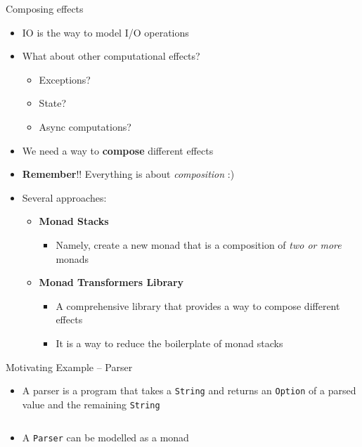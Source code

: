 \documentclass[presentation, 10pt]{beamer}\mode<presentation>{\usetheme{metropolis}}
\begin{document}
\begin{frame}{Composing effects}
\begin{itemize}
	\item IO is the way to model I/O operations
	\item What about other computational effects?
	\begin{itemize}
		\item Exceptions?
		\item State?
		\item Async computations?
	\end{itemize}
	\item We need a way to \textbf{compose} different effects
	\item \textbf{Remember}!! Everything is about \emph{composition} :)
	\item Several approaches:
	\begin{itemize}
		\item \textbf{Monad Stacks}
		\begin{itemize}
			\item Namely, create a new monad that is a composition of \emph{two or more} monads
		\end{itemize}
		\item \textbf{Monad Transformers Library}
		\begin{itemize}
			\item A comprehensive library that provides a way to compose different effects
			\item It is a way to reduce the boilerplate of monad stacks
		\end{itemize}
	\end{itemize}
\end{itemize}
\end{frame}
\begin{frame}[fragile]{Motivating Example -- Parser}
\begin{itemize}
	\item A parser is a program that takes a \texttt{String} and returns an \texttt{Option} of a parsed value and the remaining \texttt{String}
\end{itemize}
\inputminted[firstline=5, lastline=5]{scala}{code/src/main/scala/monads/Parser.scala}
\begin{itemize}
	\item A \texttt{Parser} can be modelled as a monad
\end{itemize}
\inputminted[firstline=7, lastline=17]{scala}{code/src/main/scala/monads/Parser.scala}

\end{frame}
\end{document}
